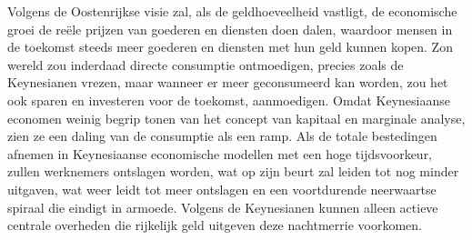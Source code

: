 \clearpage
Volgens de Oostenrijkse visie zal, als de geldhoeveelheid vastligt, de economische groei de reële prijzen van goederen en diensten doen dalen, waardoor mensen in de toekomst steeds meer goederen en diensten met hun geld kunnen kopen. Zo\textquotesingle n wereld zou inderdaad directe consumptie ontmoedigen, precies zoals de Keynesianen vrezen, maar wanneer er meer geconsumeerd kan worden, zou het ook sparen en investeren voor de toekomst, aanmoedigen. Omdat Keynesiaanse economen weinig begrip tonen van het concept van kapitaal en marginale analyse, zien ze een daling van de consumptie als een ramp. Als de totale bestedingen afnemen in Keynesiaanse economische modellen met een hoge tijdsvoorkeur, zullen werknemers ontslagen worden, wat op zijn beurt zal leiden tot nog minder uitgaven, wat weer leidt tot meer ontslagen en een voortdurende neerwaartse spiraal die eindigt in armoede. Volgens de Keynesianen kunnen alleen actieve centrale overheden die rijkelijk geld uitgeven deze nachtmerrie voorkomen.


